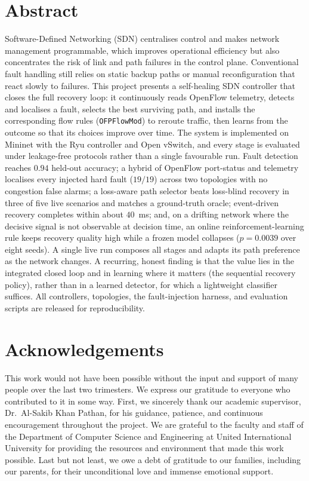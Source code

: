 \documentclass[12pt,a4paper]{report}
\begin{document}
\chapter*{Abstract}
Software-Defined Networking (SDN) centralises control and makes network management
programmable, which improves operational efficiency but also concentrates the risk of
link and path failures in the control plane. Conventional fault handling still relies on
static backup paths or manual reconfiguration that react slowly to failures. This project
presents a self-healing SDN controller that closes the full recovery loop: it continuously
reads OpenFlow telemetry, detects and localises a fault, selects the best surviving path,
and installs the corresponding flow rules (\texttt{OFPFlowMod}) to reroute traffic, then
learns from the outcome so that its choices improve over time. The system is implemented on
Mininet with the Ryu controller and Open vSwitch, and every stage is evaluated under
leakage-free protocols rather than a single favourable run. Fault detection reaches
$0.94$ held-out accuracy; a hybrid of OpenFlow port-status and telemetry localises every
injected hard fault ($19/19$) across two topologies with no congestion false alarms; a
loss-aware path selector beats loss-blind recovery in three of five live scenarios and
matches a ground-truth oracle; event-driven recovery completes within about $40$~ms; and,
on a drifting network where the decisive signal is not observable at decision time, an
online reinforcement-learning rule keeps recovery quality high while a frozen model
collapses ($p=0.0039$ over eight seeds). A single live run composes all stages and adapts
its path preference as the network changes. A recurring, honest finding is that the value
lies in the integrated closed loop and in learning where it matters (the sequential
recovery policy), rather than in a learned detector, for which a lightweight classifier
suffices. All controllers, topologies, the fault-injection harness, and evaluation scripts
are released for reproducibility.

\chapter*{Acknowledgements}
This work would not have been possible without the input and support of many people over
the last two trimesters. We express our gratitude to everyone who contributed to it in some
way. First, we sincerely thank our academic supervisor, Dr.\ Al-Sakib Khan Pathan, for his
guidance, patience, and continuous encouragement throughout the project. We are grateful to
the faculty and staff of the Department of Computer Science and Engineering at United
International University for providing the resources and environment that made this work
possible. Last but not least, we owe a debt of gratitude to our families, including our
parents, for their unconditional love and immense emotional support.
\end{document}
